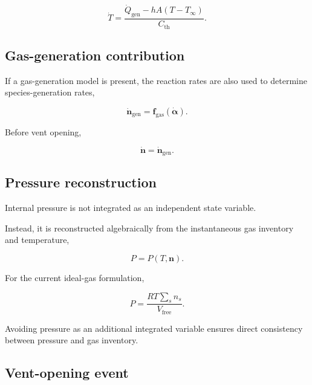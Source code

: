 \begin{equation}
    \dot{T}
    =
    \frac{
        \dot{Q}_{\mathrm{gen}}
        -
        hA(T-T_{\infty})
    }{
        C_{\mathrm{th}}
    }.
    \label{eq:rhs_temperature}
\end{equation}


\subsection{Gas-generation contribution}

If a gas-generation model is present, the reaction rates are also used
to determine species-generation rates,

\begin{equation}
    \dot{\mathbf{n}}_{\mathrm{gen}}
    =
    \mathbf{f}_{\mathrm{gas}}
    \left(
        \dot{\boldsymbol{\alpha}}
    \right).
    \label{eq:rhs_gas_generation}
\end{equation}

Before vent opening,

\begin{equation}
    \dot{\mathbf{n}}
    =
    \dot{\mathbf{n}}_{\mathrm{gen}}.
    \label{eq:rhs_closed_gas}
\end{equation}


\subsection{Pressure reconstruction}

Internal pressure is not integrated as an independent state variable.

Instead, it is reconstructed algebraically from the instantaneous gas
inventory and temperature,

\begin{equation}
    P
    =
    P
    \left(
        T,
        \mathbf{n}
    \right).
    \label{eq:pressure_algebraic_state}
\end{equation}

For the current ideal-gas formulation,

\begin{equation}
    P
    =
    \frac{
        R T
        \displaystyle\sum_s n_s
    }{
        V_{\mathrm{free}}
    }.
\end{equation}

Avoiding pressure as an additional integrated variable ensures direct
consistency between pressure and gas inventory.


\subsection{Vent-opening event}

